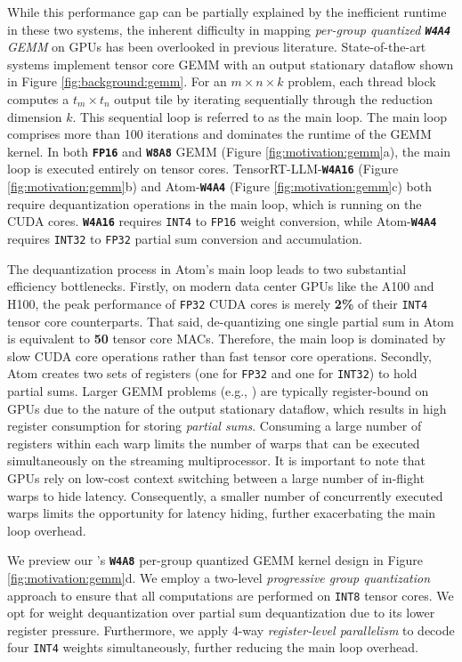 While this performance gap can be partially explained by the inefficient runtime in these two systems, the inherent difficulty in mapping  \textit{per-group quantized \textbf{\texttt{W4A4}} GEMM} on GPUs has been overlooked in previous literature. State-of-the-art systems implement tensor core GEMM with an output stationary dataflow shown in Figure \ref{fig:background:gemm}. For an $m\times n\times k$ problem, each thread block computes a $t_m\times t_n$ output tile by iterating sequentially through the reduction dimension $k$. This sequential loop is referred to as the main loop. The main loop comprises more than 100 iterations and dominates the runtime of the GEMM kernel. In both \textbf{\texttt{FP16}} and \textbf{\texttt{W8A8}} GEMM (Figure \ref{fig:motivation:gemm}a), the main loop is executed entirely on tensor cores. TensorRT-LLM-\textbf{\texttt{W4A16}} (Figure \ref{fig:motivation:gemm}b) and Atom-\textbf{\texttt{W4A4}} (Figure \ref{fig:motivation:gemm}c) both require dequantization operations in the main loop, which is running on the CUDA cores. \textbf{\texttt{W4A16}} requires \texttt{INT4} to \texttt{FP16} weight conversion, while Atom-\textbf{\texttt{W4A4}} requires \texttt{INT32} to \texttt{FP32} partial sum conversion and accumulation.

The dequantization process in Atom's main loop leads to two substantial efficiency bottlenecks. Firstly, on modern data center GPUs like the A100 and H100, the peak performance of \texttt{FP32} CUDA cores is merely \textbf{2\%} of their \texttt{INT4} tensor core counterparts. That said, de-quantizing one single partial sum in Atom is equivalent to \textbf{50} tensor core MACs. Therefore, the main loop is dominated by slow CUDA core operations rather than fast tensor core operations. Secondly, Atom creates two sets of registers (one for \texttt{FP32} and one for \texttt{INT32}) to hold partial sums. Larger GEMM problems (e.g., \contextstage) are typically register-bound on GPUs due to the nature of the output stationary dataflow, which results in high register consumption for storing \textit{partial sums}. Consuming a large number of registers within each warp limits the number of warps that can be executed simultaneously on the streaming multiprocessor. It is important to note that GPUs rely on low-cost context switching between a large number of in-flight warps to hide latency. Consequently, a smaller number of concurrently executed warps limits the opportunity for latency hiding, further exacerbating the main loop overhead.

We preview our \system's \textbf{\texttt{W4A8}} per-group quantized GEMM kernel design in Figure \ref{fig:motivation:gemm}d. We employ a two-level \textit{progressive group quantization} approach to ensure that all computations are performed on \texttt{INT8} tensor cores. We opt for weight dequantization over partial sum dequantization due to its lower register pressure. Furthermore, we apply 4-way \textit{register-level parallelism} to decode four \texttt{INT4} weights simultaneously, further reducing the main loop overhead.
